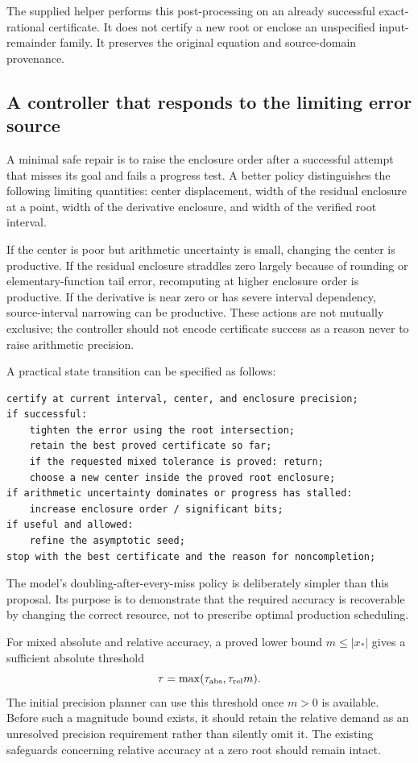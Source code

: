 The supplied  helper performs this post-processing on an already successful exact-rational certificate. It does not certify a new root or enclose an unspecified input-remainder family. It preserves the original equation and source-domain provenance.

\subsection{A controller that responds to the limiting error source}

A minimal safe repair is to raise the enclosure order after a successful attempt that misses its goal and fails a progress test. A better policy distinguishes the following limiting quantities: center displacement, width of the residual enclosure at a point, width of the derivative enclosure, and width of the verified root interval.

If the center is poor but arithmetic uncertainty is small, changing the center is productive. If the residual enclosure straddles zero largely because of rounding or elementary-function tail error, recomputing at higher enclosure order is productive. If the derivative is near zero or has severe interval dependency, source-interval narrowing can be productive. These actions are not mutually exclusive; the controller should not encode certificate success as a reason never to raise arithmetic precision.

A practical state transition can be specified as follows:
\begin{lstlisting}
certify at current interval, center, and enclosure precision;
if successful:
    tighten the error using the root intersection;
    retain the best proved certificate so far;
    if the requested mixed tolerance is proved: return;
    choose a new center inside the proved root enclosure;
if arithmetic uncertainty dominates or progress has stalled:
    increase enclosure order / significant bits;
if useful and allowed:
    refine the asymptotic seed;
stop with the best certificate and the reason for noncompletion;
\end{lstlisting}
The model's doubling-after-every-miss policy is deliberately simpler than this proposal. Its purpose is to demonstrate that the required accuracy is recoverable by changing the correct resource, not to prescribe optimal production scheduling.

For mixed absolute and relative accuracy, a proved lower bound $m\le|x_*|$ gives a sufficient absolute threshold
\[
 \tau=\max(\tau_{\rm abs},\tau_{\rm rel}m).
\]
The initial precision planner can use this threshold once $m>0$ is available. Before such a magnitude bound exists, it should retain the relative demand as an unresolved precision requirement rather than silently omit it. The existing safeguards concerning relative accuracy at a zero root should remain intact.\cite{cert}

